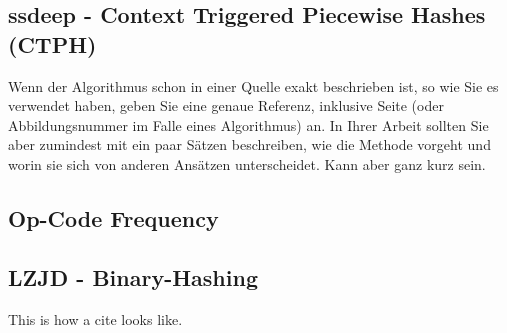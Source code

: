 
\subsection{ssdeep - Context Triggered Piecewise Hashes (CTPH)}
Wenn der Algorithmus schon in einer Quelle exakt beschrieben ist, so wie
Sie es verwendet haben, geben Sie eine genaue Referenz, inklusive Seite
(oder Abbildungsnummer im Falle eines Algorithmus) an. In Ihrer Arbeit
sollten Sie aber zumindest mit ein paar Sätzen beschreiben, wie die
Methode vorgeht und worin sie sich von anderen Ansätzen unterscheidet.
Kann aber ganz kurz sein.

\subsection{Op-Code Frequency}
\subsection{LZJD - Binary-Hashing}
This is how a cite\cite{sung2004static} looks like.

